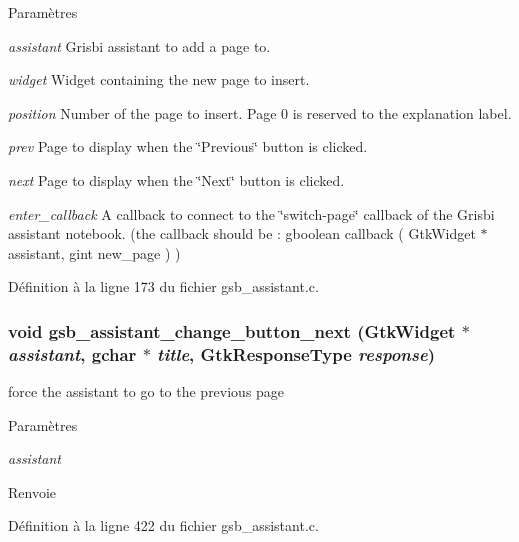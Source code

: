\begin{DoxyParams}{Paramètres}
\item[{\em assistant}]Grisbi assistant to add a page to. \item[{\em widget}]Widget containing the new page to insert. \item[{\em position}]Number of the page to insert. Page 0 is reserved to the explanation label. \item[{\em prev}]Page to display when the \char`\"{}Previous\char`\"{} button is clicked. \item[{\em next}]Page to display when the \char`\"{}Next\char`\"{} button is clicked. \item[{\em enter\_\-callback}]A callback to connect to the \char`\"{}switch-\/page\char`\"{} callback of the Grisbi assistant notebook. (the callback should be : gboolean callback ( GtkWidget $\ast$assistant, gint new\_\-page ) ) \end{DoxyParams}


Définition à la ligne 173 du fichier gsb\_\-assistant.c.

\subsubsection[{gsb\_\-assistant\_\-change\_\-button\_\-next}]{\setlength{\rightskip}{0pt plus 5cm}void gsb\_\-assistant\_\-change\_\-button\_\-next (GtkWidget $\ast$ {\em assistant}, \/  gchar $\ast$ {\em title}, \/  GtkResponseType {\em response})}\label{gsb__assistant_8h_af9667499ec49ad50593c8662801d4a9c}
force the assistant to go to the previous page


\begin{DoxyParams}{Paramètres}
\item[{\em assistant}]\end{DoxyParams}
\begin{DoxyReturn}{Renvoie}

\end{DoxyReturn}


Définition à la ligne 422 du fichier gsb\_\-assistant.c.

